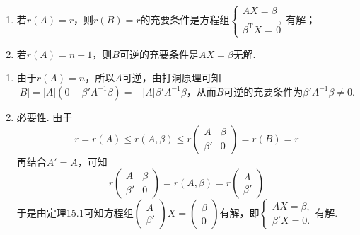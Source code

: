 \begin{exercise}
\begin{exgroup}
\begin{enumerate}
            \item 若$r(A)=r$，则$r(B)=r$的充要条件是方程组$\begin{cases}
                          AX=\beta \\ \beta^\mathrm{T}X=\vec{0}
                      \end{cases}$有解；

            \item 若$r(A)=n-1$，则$B$可逆的充要条件是$AX=\beta$无解.
        \end{enumerate}
        \begin{answer}
            \begin{enumerate}
                \item 由于$r(A)=n$，所以$A$可逆，由打洞原理可知$|B|=|A|(0-\beta' A^{-1}\beta)=-|A|\beta' A^{-1}\beta$，从而$B$可逆的充要条件为$\beta' A^{-1}\beta\neq 0$.

                \item 必要性. 由于
                      \[ r=r(A)\leqslant r(A,\beta)\leqslant r\begin{pmatrix} A & \beta \\ \beta' & 0 \end{pmatrix}=r(B)=r \]
                      再结合$A'=A$，可知
                      \[ r\begin{pmatrix} A & \beta \\ \beta' & 0 \end{pmatrix} =r(A,\beta)=r\begin{pmatrix} A \\ \beta' \end{pmatrix} \]
                      于是由定理15.1可知方程组$\begin{pmatrix} A \\ \beta' \end{pmatrix}X=\begin{pmatrix} \beta \\ 0 \end{pmatrix}$有解，即$\begin{cases} AX=\beta, \\ \beta' X=0. \end{cases}$有解.


\end{enumerate}
\end{answer}
\end{exgroup}
\end{exercise}
